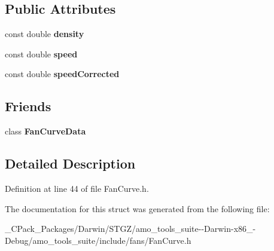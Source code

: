 \subsection*{Public Attributes}
\begin{DoxyCompactItemize}
\item 
\mbox{\label{struct_fan_curve_data_1_1_rated_point_ae85a258074490d9691d6ebac53c38b81}} 
const double {\bfseries density}
\item 
\mbox{\label{struct_fan_curve_data_1_1_rated_point_a48f6364f9e14b8a204fef020f967254e}} 
const double {\bfseries speed}
\item 
\mbox{\label{struct_fan_curve_data_1_1_rated_point_a845b68ddecfbdbf42c9ea6f0df607a03}} 
const double {\bfseries speed\+Corrected}
\end{DoxyCompactItemize}
\subsection*{Friends}
\begin{DoxyCompactItemize}
\item 
\mbox{\label{struct_fan_curve_data_1_1_rated_point_a6c0df668730aa3a6673d279f2bbe7799}} 
class {\bfseries Fan\+Curve\+Data}
\end{DoxyCompactItemize}


\subsection{Detailed Description}


Definition at line 44 of file Fan\+Curve.\+h.



The documentation for this struct was generated from the following file\+:\begin{DoxyCompactItemize}
\item 
\+\_\+\+C\+Pack\+\_\+\+Packages/\+Darwin/\+S\+T\+G\+Z/amo\+\_\+tools\+\_\+suite-\/-\/\+Darwin-\/x86\+\_-\/\+Debug/amo\+\_\+tools\+\_\+suite/include/fans/Fan\+Curve.\+h\end{DoxyCompactItemize}
